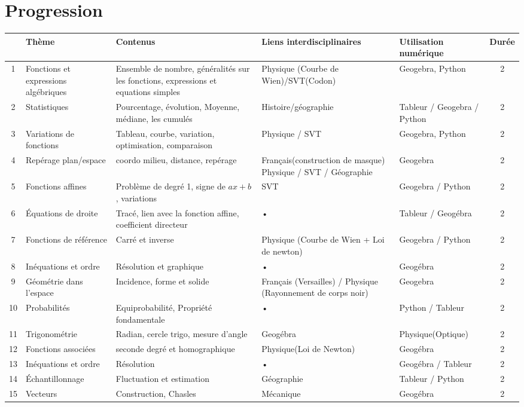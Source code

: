 
\chapter*{Progression}

\begin{tabular}{|c|>{\centering\arraybackslash}p{3cm}|p{4cm}|p{3cm}|>{\centering\arraybackslash}p{3cm}|c|}
\hline 
 & Thème & Contenus & Liens interdisciplinaires & Utilisation numérique & Durée \\ 
\hline 
1 & Fonctions et expressions algébriques & Ensemble de nombre, généralités sur les fonctions, expressions et equations simples & Physique (Courbe de Wien)/SVT(Codon) & Geogebra, Python & 2 \\ 
\hline 
2 & Statistiques & Pourcentage, évolution, Moyenne, médiane, les cumulés  & Histoire/géographie &  Tableur / Geogebra / Python & 2 \\ 
\hline 
3 & Variations de fonctions & Tableau, courbe, variation, optimisation, comparaison & Physique / SVT & Geogebra, Python & 2 \\ 
\hline 
4 & Repérage plan/espace & coordo milieu, distance, repérage & Français(construction de masque) Physique / SVT / Géographie & Geogebra & 2 \\ 
\hline 
5 & Fonctions affines & Problème de degré 1, signe de $ax+b$, variations & SVT & Geogebra / Python & 2 \\ 
\hline 
6 & Équations de droite & Tracé, lien avec la fonction affine, coefficient directeur & • & Tableur /  Geogébra & 2 \\ 
\hline 
7 & Fonctions de référence & Carré et inverse & Physique (Courbe de Wien + Loi de newton) & Geogebra / Python & 2 \\ 
\hline 
8 & Inéquations et ordre & Résolution et graphique & • & Geogébra & 2 \\ 
\hline 
9 & Géométrie dans l'espace & Incidence, forme et solide & Français (Versailles) / Physique (Rayonnement de corps noir) & Geogebra & 2 \\ 
\hline 
10 & Probabilités & Equiprobabilité, Propriété fondamentale & • & Python / Tableur  & 2 \\ 
\hline 
11 & Trigonométrie & Radian, cercle trigo, mesure d'angle & Geogébra & Physique(Optique) & 2 \\ 
\hline 
12 & Fonctions associées & seconde degré et homographique & Physique(Loi de Newton) & Geogébra & 2 \\ 
\hline 
13 & Inéquations et ordre & Résolution & • & Geogébra / Tableur  & 2 \\ 
\hline 
14 & Échantillonnage & Fluctuation et estimation & Géographie & Tableur / Python & 2 \\ 
\hline 
15 & Vecteurs & Construction, Chasles  & Mécanique & Geogébra & 2 \\ 
\hline 
\end{tabular} 